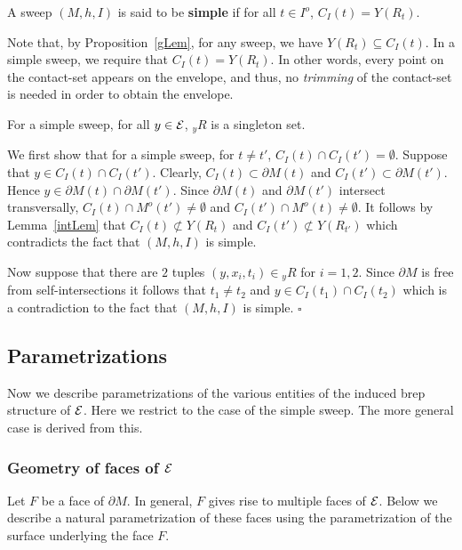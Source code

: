 \documentclass{elsart5p}
\newcommand{\eat}[1]{}
\begin{document}
\begin{defn} \label{simpleDef}
A sweep $(M,h,I)$ is said to be {\bf simple} if for all $t \in I^o$, 
$C_I(t) = Y(R_t)$. \end{defn} 

Note that, by Proposition~\ref{gLem}, for any sweep, we have 
$Y(R_t) \subseteq C_I(t)$. In a simple sweep, we require that $C_I(t) = Y(R_t)$.
In other words, every point on the contact-set appears on the envelope, and 
thus, no {\em trimming} of the contact-set is needed in order to obtain the envelope.

\begin{lem} \label{simpleLem}
For a simple sweep, for all $y \in {\cal E}$, ${_y} R$ is a singleton set.
\end{lem}
 We first show that for a simple sweep, for 
$t \neq t'$, $C_I(t) \cap C_I(t') = \emptyset$.  Suppose that $y \in C_I(t) \cap C_I(t')$.
Clearly, $C_I(t) \subset \partial M(t)$ and $C_I(t') \subset \partial M(t')$. 
Hence $y \in \partial M(t) \cap \partial M(t')$.  Since $\partial M(t)$ and 
$\partial M(t')$ intersect transversally, $C_I(t) \cap M^o(t') \neq \emptyset$ and 
$C_I(t') \cap M^o(t) \neq \emptyset$.  It follows by Lemma~\ref{intLem} that 
$C_I(t) \not \subset Y(R_t)$ and $C_I(t') \not \subset Y(R_{t'})$ which
contradicts the fact that $(M,h,I)$ is simple.

Now suppose that there are $2$ tuples $(y, x_i, t_i) \in {_y}R$ for $i= 1,2$.  Since $\partial M$ is free from self-intersections 
it follows that $t_1 \neq t_2$ and $y \in C_I(t_1) \cap C_I(t_2)$ which is a contradiction to the fact that 
$(M,h,I)$ is simple.
\hfill $\square$

\subsection{Parametrizations}	\label{paramSec}
Now we describe parametrizations of the various entities
of the induced brep structure of ${\cal E}$. Here we restrict to the
case of the simple sweep. The more general case is derived from this. 
\eat{As mentioned before, the brep ${\partial M}$ consists
of faces, edges and vertices. These geometric entities give rise to
corresponding entities on ${\cal E}$ (see Figure~\ref{coneFig}).}

\subsubsection{Geometry of faces of ${\cal E}$}\label{keynotation}
Let $F$ be a face of ${\partial M}$. In general, $F$ gives rise to 
multiple faces of ${\cal E}$. Below we describe a natural parametrization of
these faces using the parametrization of the surface underlying the
face $F$.
\end{document}
